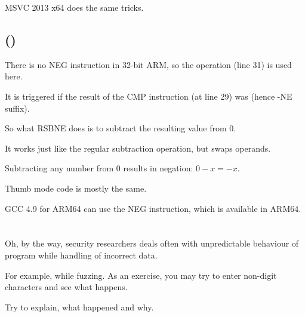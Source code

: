 \Optimizing MSVC 2013 x64 does the same tricks.

\subsection{\OptimizingKeilVI (\ARMMode)}



There is no NEG instruction in 32-bit ARM, so the  operation (line 31) 
is used here.

It is triggered if the result of the CMP instruction (at line 29) was  (hence -NE suffix).

So what RSBNE does is to subtract the resulting value from 0.

It works just like the regular subtraction operation, but swaps operands.

Subtracting any number from 0 results in negation: $0-x=-x$.

Thumb mode code is mostly the same.

GCC 4.9 for ARM64 can use the NEG instruction, which is available in ARM64.

\section{\Exercise{}}

Oh, by the way, security researchers deals often with unpredictable behaviour of program while handling of incorrect data.

For example, while fuzzing.
As an exercise, you may try to enter non-digit characters and see what happens.

Try to explain, what happened and why.



